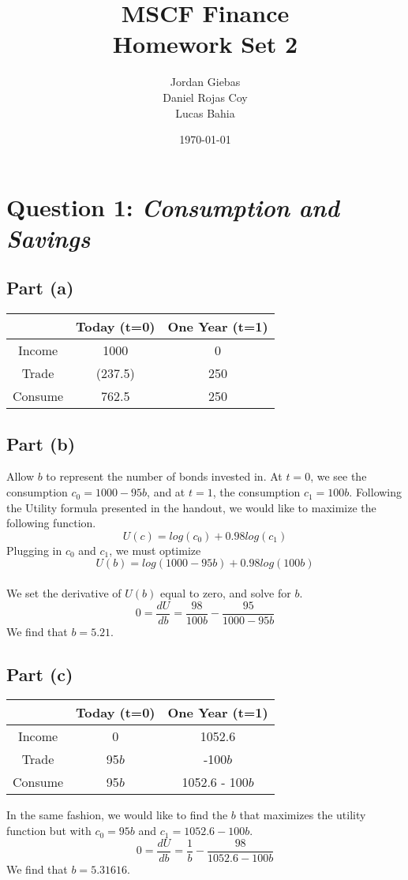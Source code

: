 \documentclass[12pt]{article}
\title{MSCF Finance\\ Homework Set 2}
\author{
Jordan Giebas \\
Daniel Rojas Coy \\ 
Lucas Bahia 
}
\date{\today}
\begin{document}
\maketitle

\section{Question 1: \textit{Consumption and Savings}}

	\subsection{Part (a)}
	
		\begin{center}
 		\begin{tabular}{||c c c||} 
 		\hline
 		 & Today (t=0) &  One Year (t=1) \\ [0.5ex] 
 		\hline \hline
 		Income & 1000 & 0 \\ 
 		\hline
 		Trade  & (237.5) & 250 \\
 		\hline
 		 Consume & 762.5 & 250  \\
 		\hline
		\end{tabular}
		\end{center}
		
	\subsection{Part (b)}
	
		Allow $b$ to represent the number of bonds invested in. At $t=0$, we see the consumption $c_{0} = 1000 - 95b$, and 
		at $t=1$, the consumption $c_{1} = 100b$. Following the Utility formula presented in the handout, we would like to maximize
		the following function. 
		$$ U(c) = log(c_{0}) + 0.98log(c_{1}) $$
		Plugging in $c_{0}$ and $c_{1}$, we must optimize 
		$$ U(b) = log(1000 - 95b) + 0.98log(100b) $$
		\\		
		We set the derivative of $U(b)$ equal to zero, and solve for $b$.
		$$ 0 = \frac{dU}{db} = \frac{98}{100b} - \frac{95}{1000 - 95b} $$
		We find that $b = 5.21$. 
		
		\subsection{Part (c)}
		
			\begin{center}
 			\begin{tabular}{||c c c||} 
 			\hline
 			 & Today (t=0) &  One Year (t=1) \\ [0.5ex] 
 			\hline \hline
 			Income & 0 & 1052.6 \\ 
 			\hline
 			Trade  & 95$b$ & -100$b$ \\
 			\hline
 			 Consume & 95$b$ & 1052.6 - 100$b$  \\
 			\hline
			\end{tabular}
			\end{center}
			In the same fashion, we would like to find the $b$ that maximizes the utility function but with $c_{0} = 95b$ and $c_{1} = 1052.6 - 100b$.
			$$  0 = \frac{dU}{db} = \frac{1}{b} - \frac{98}{1052.6 - 100b} $$
			We find that $b = 5.31616$. 
			
\end{document}
